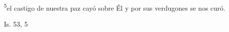 \documentclass[../../rosario.tex]{subfiles}
\begin{document}
    \textsuperscript{5}el castigo de nuestra paz cayó sobre Él y por sus verdugones se nos curó.
    \begin{flushright}
    Is. 53, 5
    \end{flushright}
\end{document}
